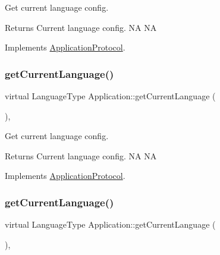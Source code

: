 Get current language config. 

\begin{DoxyReturn}{Returns}
Current language config.  NA  NA 
\end{DoxyReturn}


Implements \hyperlink{classApplicationProtocol_a44034ed02f9dd0fc59264f74f9ef9b17}{Application\+Protocol}.

\mbox{\label{classApplication_ac972f15de44614b03604fb4e3e05cab3}} 
\subsubsection{\texorpdfstring{get\+Current\+Language()}{getCurrentLanguage()}\hspace{0.1cm}{\footnotesize\ttfamily [7/12]}}
{\footnotesize\ttfamily virtual Language\+Type Application\+::get\+Current\+Language (\begin{DoxyParamCaption}{ }\end{DoxyParamCaption})\hspace{0.3cm}{\ttfamily [override]}, {\ttfamily [virtual]}}



Get current language config. 

\begin{DoxyReturn}{Returns}
Current language config.  NA  NA 
\end{DoxyReturn}


Implements \hyperlink{classApplicationProtocol_a44034ed02f9dd0fc59264f74f9ef9b17}{Application\+Protocol}.

\mbox{\label{classApplication_ac972f15de44614b03604fb4e3e05cab3}} 
\subsubsection{\texorpdfstring{get\+Current\+Language()}{getCurrentLanguage()}\hspace{0.1cm}{\footnotesize\ttfamily [8/12]}}
{\footnotesize\ttfamily virtual Language\+Type Application\+::get\+Current\+Language (\begin{DoxyParamCaption}{ }\end{DoxyParamCaption})\hspace{0.3cm}{\ttfamily [override]}, {\ttfamily [virtual]}}



